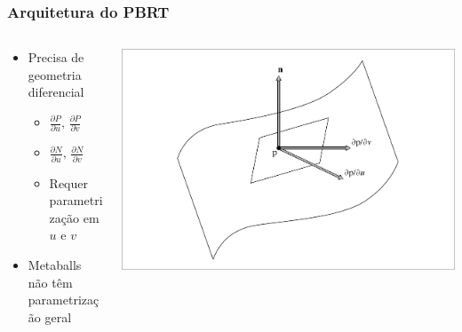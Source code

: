 \documentclass[brazil]{beamer}
\begin{document}
    \begin{frame}
      \frametitle{Arquitetura do PBRT}
      \begin{columns}
        \begin{column}{0.5\textwidth}
          \begin{itemize}
            \item Precisa de geometria diferencial
            \begin{itemize}
              \vspace{0.2em}
              \item $ \frac{\partial P}{\partial u}\text{, }\frac{\partial P}{\partial v}$
              \vspace{0.2em}
              \item $ \frac{\partial N}{\partial u}\text{, }\frac{\partial N}{\partial v}$
              \vspace{0.2em}
              \item Requer parametrização em $u$ e $v$
            \end{itemize}
            \item Metaballs não têm parametrização geral
          \end{itemize}
        \end{column}
        \begin{column}{0.5\textwidth}
          \begin{center}
            \includegraphics[width=\textwidth]{imgs/diffgeom.png}
          \end{center}
        \end{column}
      \end{columns}
    \end{frame}    
\end{document}
